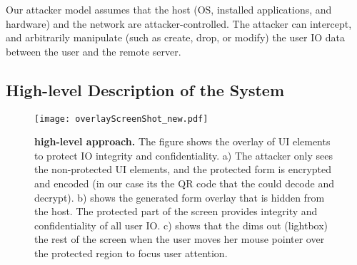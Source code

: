  Our attacker model assumes that the host (OS, installed applications, and hardware) and the network are attacker-controlled. The attacker can intercept, and arbitrarily manipulate (such as create, drop, or modify) the user IO data between the user and the remote server. 



\subsection{High-level Description of the System}

\begin{figure}[t]
\centering
\texttt{[image: overlayScreenShot\_new.pdf]}
\caption{\textbf{\name high-level approach.} The figure shows the \device overlay of UI elements to protect IO integrity and confidentiality. a) The attacker only sees the non-protected UI elements, and the protected form is encrypted and encoded (in our case its the QR code that the \device could decode and decrypt). b) shows the \device generated form overlay that is hidden from the host. The protected part of the screen provides integrity and confidentiality of all user IO. c) shows that the \device dims out (lightbox) the rest of the screen when the user moves her mouse pointer over the protected region to focus user attention.}
\spacesave
\label{fig:screenshot_1}
\end{figure}


